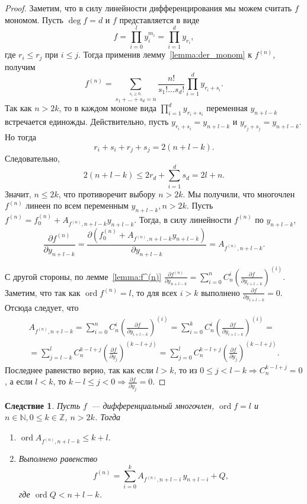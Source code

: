 \documentclass[16pt]{article}
\DeclareMathOperator{\ord}{ord}
\renewcommand{\le}{\leqslant} %
\renewcommand{\ge}{\geqslant} %
\theoremstyle{plain1}
\theoremstyle{plain2}
\theoremstyle{plain}
\theoremstyle{plain3}
\newtheorem{corollary}[theorem1]{Следствие}
\theoremstyle{definition}
\theoremstyle{remark}
\begin{document}
\begin{proof}
Заметим, что в силу линейности дифференцирования мы можем считать
$f$ мономом. Пусть $\deg f = d$ и $f$ представляется в
виде
$$
f=\prod\limits_{i=0}^ly_i^{m_i}=\prod\limits_{i=1}^{d}y_{r_i},
$$
где $r_i\le r_j$ при $i \le j$. Тогда применив лемму~\ref{lemma:der_monom} к $f^{(n)}$,
получим
$$
f^{(n)}=\sum\limits_{\stackrel{s_i\ge0,}{
s_1+\ldots+s_d=n}}\frac{n!}{s_1!\ldots s_d!}
\prod\limits_{i=1}^dy_{r_i+s_i}.
$$
Так как $n>2k$, то в каждом мономе вида $\prod_{i=1}^d y_{r_i+s_i}$
переменная $y_{n+l-k}$ встречается единожды. Действительно, пусть
$y_{r_i+s_i}=y_{n+l-k}$ и $y_{r_j+s_j}=y_{n+l-k}$. Но тогда
$$
r_i+s_i+r_j+s_j = 2(n+l-k).
$$
Следовательно,
$$
2(n+l-k)\le 2r_d + \sum_{i=1}^d s_d = 2l +n.
$$
Значит, $n \le 2k$, что противоречит выбору $n>2k$. Мы получили, что многочлен $f^{(n)}$ линеен по всем переменным $y_{n+l-k},n>2k $. Пусть $f^{(n)}=f^{(n)}_0+A_{f^{(n)},n+l-k}y_{n+l-k}$. Тогда, в силу линейности $f^{(n)}$ по $y_{n+l-k}$,
$$
\frac{\partial f^{(n)}}{\partial y_{n+l-k}}=\frac{\partial (f^{(n)}_0+A_{f^{(n)},n+l-k}y_{n+l-k})}{\partial y_{n+l-k}}=A_{f^{(n)},n+l-k}.
$$

С другой стороны, по лемме~\ref{lemma:f^(n)} $\frac{\partial f^{(n)}}{\partial y_{n+l-k}}= \sum\limits_{i=0}^n  C_n^i  \left(\frac{\partial f}{\partial y_{i+l-k}}\right)^{(i)} $. Заметим, что так как $\ord f^{(n)} = l$, то для всех $i>k$ выполнено $\frac{\partial f}{\partial y_{i+l-k}}=0$. Отсюда следует, что 
\begin{gather*}
A_{f^{(n)},n+l-k}=\sum\limits_{i=0}^n  C_n^i  \left(\frac{\partial f}{\partial y_{i+l-k}}\right)^{(i)}=\sum\limits_{i=0}^k  C_n^i  \left(\frac{\partial f}{\partial y_{i+l-k}}\right)^{(i)}=\\
=\sum\limits_{j=l-k}^l  C_n^{k-l+j}  \left(\frac{\partial f}{\partial y_{j}}\right)^{(k-l+j)}=\sum\limits_{j=0}^{l}C_n^{k - l + j
}\left(\frac{\partial f}{\partial y_j}\right)^{(k - l + j)}.
\end{gather*}
Последнее равенство верно, так как если $l>k$, то из $0 \le j<l-k \Longrightarrow C_n^{k-l+j}=0$, а если $l<k$, то  $k-l\le j<0 \Longrightarrow \frac{\partial f}{\partial y_{j}}=0$. 
\end{proof}

\begin{corollary}\label{corollary:deriv_equal}
Пусть $f$~--- дифференциальный многочлен, $\ord f = l$ и $n\in\mathbb{N},0\le k\in\mathbb{Z}$, $n>2k$.
Тогда
\begin{enumerate}
\item $\ord A_{f^{(n)},n+l-k}\le k+l$.

\item Выполнено равенство
$$
f^{(n)}=\sum\limits_{i=0}^{k} A_{f^{(n)},n+l -i} \, y_{n+l-i} + Q,
$$
где $\ord Q < n+l-k$.
\end{enumerate}
\end{corollary}
\end{document}
